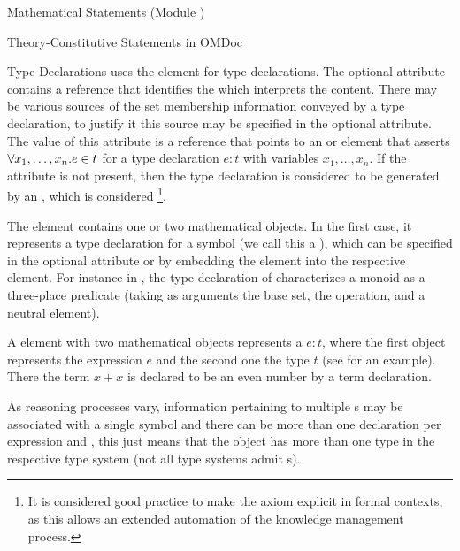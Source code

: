 \begin{tchapter}[id=statements,short=Mathematical Statements]{Mathematical Statements (Module {})}
\begin{tsection}[id=definitions]{Theory-Constitutive Statements in OMDoc}
\begin{tsubsection}[id=type-axioms]{Type Declarations}
  {\omdoc} uses the {} element for type declarations. The optional attribute
  {} contains a {} reference that identifies the
  {} which interprets the content. There may be various sources of
  the set membership information conveyed by a type declaration, to justify it this source
  may be specified in the optional {} attribute. The value of
  this attribute is a {} reference that points to an {}
  or {} element that asserts ${\forall{x_1,\ldots,x_n}.{e\in t}}$ for a type
  declaration $e\colon t$ with variables $x_1,\ldots,x_n$.  If the
  {} attribute is not present, then the type declaration is
  considered to be generated by an {}, which is considered
  {}\footnote{It is considered good practice to make the
    axiom explicit in formal contexts, as this allows an extended automation of the
    knowledge management process.}.
  
  The {} element contains one or two mathematical objects. In the first
  case, it represents a type declaration for a symbol (we call this a
  {}), which can be specified in the optional
  {} attribute or by embedding the {} element into the
  respective {} element. For instance in , the type
  declaration of {} characterizes a monoid as a three-place predicate
  (taking as arguments the base set, the operation, and a neutral element).

  A {} element with two mathematical objects represents a
  {} $e\colon t$, where the first object represents the
  expression $e$ and the second one the type $t$ (see {} for an
  example). There the term $x+x$ is declared to be an even number by a term declaration.
   
  As reasoning processes vary, information pertaining to multiple
  {s} may be associated with a single symbol and there can
  be more than one {} declaration per expression and
  {}, this just means that the object has more than one type
  in the respective type system (not all type systems admit
  {s}).
\end{tsubsection}


\end{tsection}
\end{tchapter}
